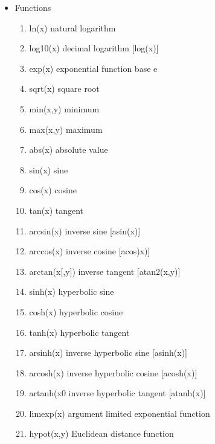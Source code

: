 \begin{itemize}
\item Functions\begin{enumerate}
		\item ln(x)     natural logarithm
		\item log10(x)  decimal logarithm \hspace{2mm} [log(x)]
		\item exp(x)	exponential function base e
		\item sqrt(x)   square root
		\item min(x,y)  minimum
                \item max(x,y)  maximum
		\item abs(x)    absolute value
		\item sin(x)    sine
		\item cos(x)    cosine
		\item tan(x)    tangent
		\item arcsin(x) inverse sine  \hspace{2mm} [asin(x)]
		\item arccos(x) inverse cosine \hspace{2mm} [acos)x)]
		\item arctan(x[,y]) inverse tangent \hspace{2mm} [atan2(x,y)]
		\item sinh(x)   hyperbolic sine
		\item cosh(x)   hyperbolic cosine
		\item tanh(x)   hyperbolic tangent
		\item arsinh(x) inverse hyperbolic sine  \hspace{2mm} [asinh(x)]
		\item arcosh(x) inverse hyperbolic cosine \hspace{2mm} [acosh(x)]
		\item artanh(x0 inverse hyperbolic tangent \hspace{2mm} [atanh(x)]
		\item limexp(x) argument limited exponential function
		\item hypot(x,y) Euclidean distance function
		
               \end{enumerate} 

\end{itemize}



\newpage 


